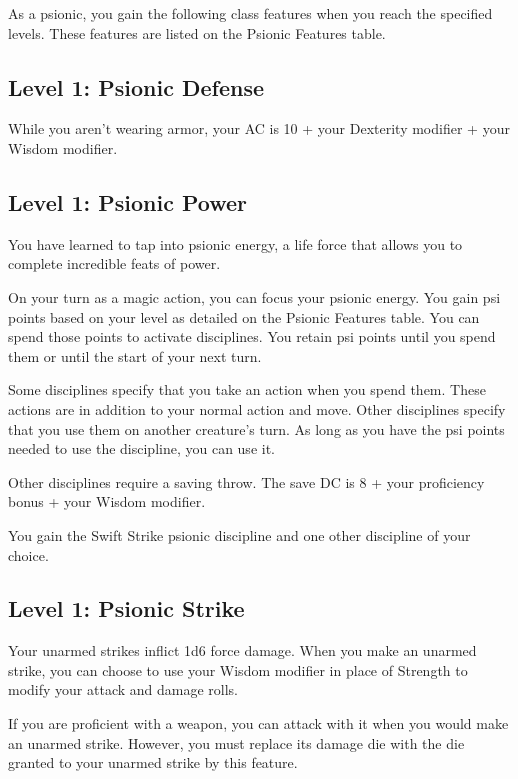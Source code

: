 \documentclass[12pt,letterpaper,twocolumn,openany,nodeprecatedcode,bg=none]{dndbook}
\begin{document}
As a psionic, you gain the following class features when you reach the
specified levels. These features are listed on the Psionic Features
table.

\subsection{Level 1: Psionic Defense}\label{level-1-psionic-defense}

While you aren't wearing armor, your AC is 10 + your Dexterity modifier
+ your Wisdom modifier.

\subsection{Level 1: Psionic Power}\label{level-1-psionic-power}

You have learned to tap into psionic energy, a life force that allows
you to complete incredible feats of power.

On your turn as a magic action, you can focus your psionic energy. You
gain psi points based on your level as detailed on the Psionic Features
table. You can spend those points to activate disciplines. You retain
psi points until you spend them or until the start of your next turn.

Some disciplines specify that you take an action when you spend them.
These actions are in addition to your normal action and move. Other
disciplines specify that you use them on another creature's turn. As
long as you have the psi points needed to use the discipline, you can
use it.

Other disciplines require a saving throw. The save DC is 8 + your
proficiency bonus + your Wisdom modifier.

You gain the Swift Strike psionic discipline and one other discipline of
your choice.

\subsection{Level 1: Psionic Strike}\label{level-1-psionic-strike}

Your unarmed strikes inflict 1d6 force damage. When you make an unarmed
strike, you can choose to use your Wisdom modifier in place of Strength
to modify your attack and damage rolls.

If you are proficient with a weapon, you can attack with it when you
would make an unarmed strike. However, you must replace its damage die
with the die granted to your unarmed strike by this feature.
\end{document}
